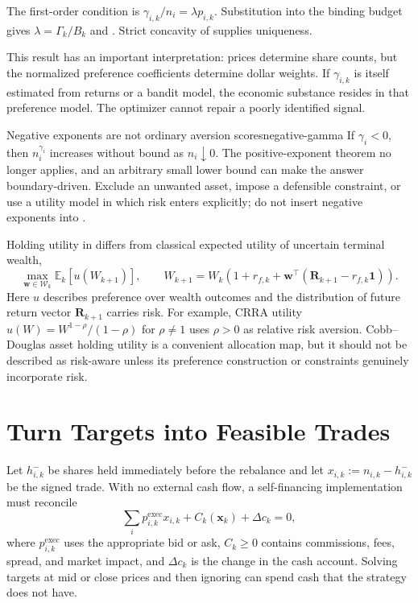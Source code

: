 \documentclass[11pt]{article}
\newcommand{\E}{\mathbb{E}}
\begin{document}
The first-order condition is $\gamma_{i,k}/n_i=\lambda p_{i,k}$. Substitution into the binding budget gives $\lambda=\Gamma_k/B_k$ and . Strict concavity of  supplies uniqueness.

This result has an important interpretation: prices determine share counts, but the normalized preference coefficients determine dollar weights. If $\gamma_{i,k}$ is itself estimated from returns or a bandit model, the economic substance resides in that preference model. The optimizer cannot repair a poorly identified signal.

\begin{remark}{Negative exponents are not ordinary aversion scores}{negative-gamma}
If $\gamma_i<0$, then $n_i^{\gamma_i}$ increases without bound as $n_i\downarrow0$. The positive-exponent theorem no longer applies, and an arbitrary small lower bound can make the answer boundary-driven. Exclude an unwanted asset, impose a defensible constraint, or use a utility model in which risk enters explicitly; do not insert negative exponents into .
\end{remark}

Holding utility in  differs from classical expected utility of uncertain terminal wealth,
\begin{equation}
  \label{eq:expected-utility}
  \max_{\mathbf w\in\mathcal W_k}
  \E_k\!\left[u\!\left(W_{k+1}\right)\right],
  \qquad
  W_{k+1}=W_k\left(1+r_{f,k}+\mathbf w^\top
  (\mathbf R_{k+1}-r_{f,k}\mathbf 1)\right).
\end{equation}
Here $u$ describes preference over wealth outcomes and the distribution of future return vector $\mathbf R_{k+1}$ carries risk. For example, CRRA utility $u(W)=W^{1-\rho}/(1-\rho)$ for $\rho\neq1$ uses $\rho>0$ as relative risk aversion. Cobb--Douglas asset holding utility is a convenient allocation map, but it should not be described as risk-aware unless its preference construction or constraints genuinely incorporate risk.

\section{Turn Targets into Feasible Trades}

Let $h_{i,k}^-$ be shares held immediately before the rebalance and let $x_{i,k}:=n_{i,k}-h_{i,k}^-$ be the signed trade. With no external cash flow, a self-financing implementation must reconcile
\begin{equation}
  \label{eq:self-financing}
  \sum_i p^{\mathrm{exec}}_{i,k}x_{i,k}
  +C_k(\mathbf x_k)
  +\Delta c_k=0,
\end{equation}
where $p^{\mathrm{exec}}_{i,k}$ uses the appropriate bid or ask, $C_k\geq0$ contains commissions, fees, spread, and market impact, and $\Delta c_k$ is the change in the cash account. Solving targets at mid or close prices and then ignoring  can spend cash that the strategy does not have.
\end{document}
